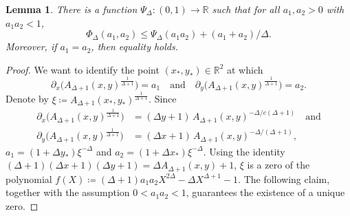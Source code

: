 \documentclass{article}
\numberwithin{equation}{section}
\theoremstyle{plain}
\newtheorem{lemma}[theorem]{Lemma}
\theoremstyle{definition}
\theoremstyle{remark} %
\newcommand{\defeq}{\coloneqq}
\newcommand{\RR}{\mathbb{R}}
\begin{document}
\begin{lemma}\label{lem:Phi-upper-bound}
    There is a function \(\Psi_\Delta\colon(0,1)\to\RR\) such that for all \(a_1,a_2>0\) with \(a_1a_2<1\), 
    \[
        \Phi_\Delta(a_1,a_2) \le \Psi_\Delta(a_1a_2) + (a_1+a_2)/\Delta.
    \]
    Moreover, if \(a_1=a_2\), then equality holds.
\end{lemma}
\begin{proof}
    We want to identify the point \((x_*,y_*)\in\RR^2\) at which
    \[
        \partial_x \bigl( A_{\Delta+1}(x,y)^{\frac{1}{\Delta+1}} \bigr) = a_1
        \quad\text{and}\quad
        \partial_y \bigl( A_{\Delta+1}(x,y)^{\frac{1}{\Delta+1}} \bigr) = a_2.
    \]
    Denote by $\xi\defeq A_{\Delta+1}(x_*,y_*)^{\frac{1}{\Delta+1}}$.
    Since
    \begin{align*}
        \partial_x \bigl( A_{\Delta+1}(x,y)^{\frac{1}{\Delta+1}} \bigr)
        &= (\Delta y+1) \, A_{\Delta+1}(x,y)^{-\Delta/e(\Delta+1)}
        \quad\text{and}\\
        \partial_y \bigl( A_{\Delta+1}(x,y)^{\frac{1}{\Delta+1}} \bigr)
        &= (\Delta x+1) \, A_{\Delta+1}(x,y)^{-\Delta/(\Delta+1)},
    \end{align*}
    $a_1=(1+\Delta y_*)\xi^{-\Delta}$ and $a_2=(1+\Delta x_*)\xi^{-\Delta}$. Using the identity \((\Delta+1)(\Delta x+1)(\Delta y+1) = \Delta A_{\Delta+1}(x,y) + 1\),
    $\xi$ is a zero of the polynomial $f(X)\defeq(\Delta+1)a_1a_2 X^{2\Delta} - \Delta X^{\Delta+1} - 1$.
    The following claim, together with the assumption \(0<a_1a_2<1\), guarantees the existence of a unique zero.
    

\end{proof}
\end{document}
